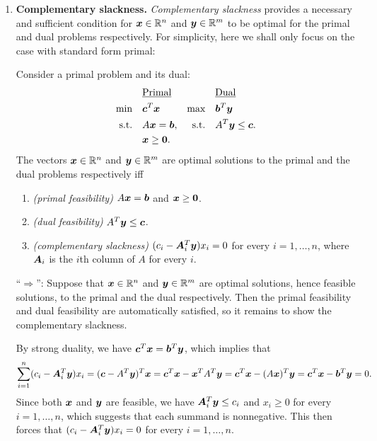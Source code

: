 \begin{enumerate}
\item\label{it:comp-slackness} \textbf{Complementary slackness.}
\emph{Complementary slackness} provides a necessary and sufficient condition
for \(\bm{x}\in\mathbb{R}^n\) and \(\bm{y}\in\mathbb{R}^m\) to be optimal for the primal and dual
problems respectively. For simplicity, here we shall only focus on the case
with standard form primal:
\begin{theorem}
\label{thm:optim-comp-slackness}
Consider a primal problem and its dual:
\begin{align*}
&\text{\underline{Primal}}&&\text{\underline{Dual}} \\
\text{min}\quad&\bm{c}^{T}\bm{x}&\text{max}\quad&\bm{b}^{T}\bm{y} \\
\text{s.t.}\quad&A\bm{x}=\bm{b},&\text{s.t.}\quad&A^{T}\bm{y}\le\bm{c}. \\
\quad&\bm{x}\ge\bm{0}.
\end{align*}
The vectors \(\bm{x}\in\mathbb{R}^n\) and \(\bm{y}\in\mathbb{R}^m\) are optimal solutions
to the primal and the dual problems respectively iff
\begin{enumerate}[label={(\arabic*)}]
\item \emph{(primal feasibility)} \(A\bm{x}=\bm{b}\) and \(\bm{x}\ge\bm{0}\).
\item \emph{(dual feasibility)} \(A^{T}\bm{y}\le\bm{c}\).
\item \emph{(complementary slackness)} \((c_i-\bm{A}_i^{T}\bm{y})x_i=0\)
for every \(i=1,\dotsc,n\), where \(\bm{A}_i\) is the \(i\)th column of
\(A\) for every \(i\).
\end{enumerate}
\end{theorem}
\begin{pf}
``\(\Rightarrow\)'': Suppose that \(\bm{x}\in\mathbb{R}^n\) and \(\bm{y}\in\mathbb{R}^m\)
are optimal solutions, hence feasible solutions, to the primal and the dual
respectively.  Then the primal feasibility and dual feasibility are
automatically satisfied, so it remains to show the complementary slackness.

By strong duality, we have \(\bm{c}^{T}\bm{x}=\bm{b}^{T}\bm{y}\), which
implies that
\[
\sum_{i=1}^{n}(c_i-\bm{A}_i^{T}\bm{y})x_i
=(\bm{c}-A^{T}\bm{y})^{T}\bm{x}
=\bm{c}^{T}\bm{x}-\bm{x}^{T}A^{T}\bm{y}
=\bm{c}^{T}\bm{x}-(A\bm{x})^{T}\bm{y}
=\bm{c}^{T}\bm{x}-\bm{b}^{T}\bm{y}
=0.
\]
Since both \(\bm{x}\) and \(\bm{y}\) are feasible, we have
\(\bm{A}_i^{T}\bm{y}\le c_i\) and \(x_i\ge 0\) for every \(i=1,\dotsc,n\),
which suggests that each summand is nonnegative. This then forces that
\((c_i-\bm{A}_i^{T}\bm{y})x_i=0\) for every \(i=1,\dotsc,n\).


\end{pf}
\end{enumerate}
